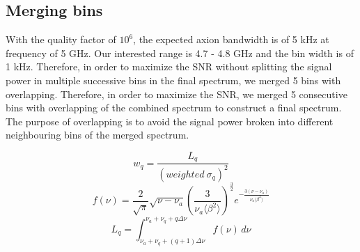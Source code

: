 
\subsection{Merging bins}

With the quality factor of $10^6$, the expected axion bandwidth is of 5 kHz at frequency of 5 GHz. Our interested range is 4.7 - 4.8 GHz and the bin width is of 1 kHz. Therefore, in order to maximize the SNR without splitting the signal power in multiple successive bins in the final spectrum, we merged 5 bins with overlapping.
Therefore, in order to maximize the SNR, we merged 5 consecutive bins with overlapping of the combined spectrum to construct a final spectrum. The purpose of overlapping is to avoid the signal power broken into different neighbouring bins of the merged spectrum. 


\begin{equation}
    \label{eq:merge_weight}
    w_{q} = \frac{L_{q}}{(weighted\ \sigma_{q})^{2}}
\end{equation}
\begin{equation}
    \label{eq:axion_line_shape}
    f(\nu) = \frac{2}{\sqrt{\pi}}\sqrt{\nu - \nu_a} \left( \frac{3}{\nu_a \big \langle \beta^{2} \big \rangle }\right)^{\frac{3}{2}} e^{- \frac{3(\nu-\nu_a)}{\nu_a \big \langle \beta^{2} \big \rangle}}
\end{equation}
\begin{equation}
    \label{eq:L_q_integtal}
    L_{q} = \int_{\nu_a +\nu_q + (q+1)\Delta\nu}^{\nu_a +\nu_q + q\Delta\nu} f(\nu) \,d\nu
\end{equation}

